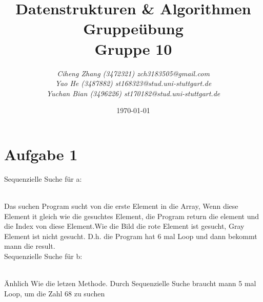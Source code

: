\documentclass{article}
\begin{document}
\begin{titlepage}
    \title{\Huge \textbf{Datenstrukturen \& Algorithmen Gruppeübung\\Gruppe 10} }
    \author{\LARGE \textsl{Ciheng Zhang (3472321) zch3183505@gmail.com}\\\LARGE \textsl{Yao He (3487882) st168323@stud.uni-stuttgart.de}\\\LARGE \textsl{Yuchan Bian (3496226) st170182@stud.uni-stuttgart.de} \\[200pt]}
    \date{\today}
    \maketitle
    \thispagestyle{empty}
\end{titlepage}
\newpage
\section{Aufgabe 1}
Sequenzielle Suche für a:\\
\\
Das suchen Program sucht von die erste Element in die Array, Wenn diese Element it gleich wie die gesuchtes Element, die Program return die element und die Index von diese Element.Wie die Bild
die rote Element ist gesucht, Gray Element ist nicht gesucht. D.h. die Program hat 6 mal Loop und dann bekommt mann die result.
\\Sequenzielle Suche für b:\\
\\
Änhlich Wie die letzen Methode. Durch Sequenzielle Suche braucht mann 5 mal Loop, um die Zahl 68 zu suchen\\
\end{document}
